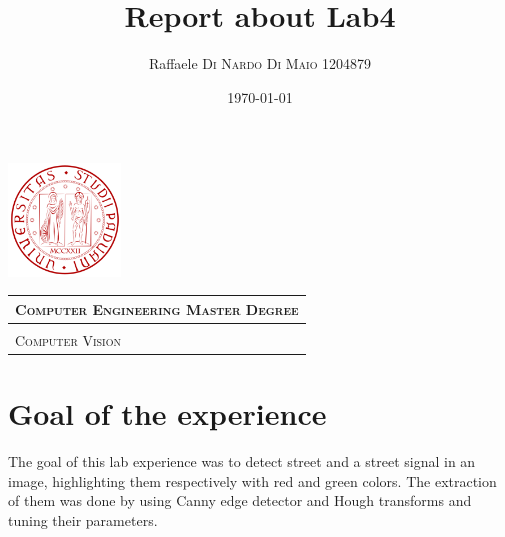 \documentclass{article}
\title{\textbf{Report about Lab4}} %
\author{Raffaele \textsc{Di Nardo Di Maio} 1204879} %
\date{\today}
\begin{document}
\begin{minipage}{.20\textwidth}
  \includegraphics[height=3cm]{../Icon4}
\end{minipage}\begin{minipage}{.20\textwidth}
  \begin{table}[H]
  \begin{tabular}{l}
  \scshape{\Large{Computer Engineering Master Degree}} \\
  \hline \\
  \scshape{\Large{Computer Vision}} \\
  \end{tabular}
  \end{table}
\end{minipage}
{\let\newpage\relax\maketitle}

\section{Goal of the experience}
The goal of this lab experience was to detect street and a street signal in an image, highlighting them respectively with red and green colors. The extraction of them was done by using Canny edge detector and Hough transforms and tuning their parameters.
\end{document}
